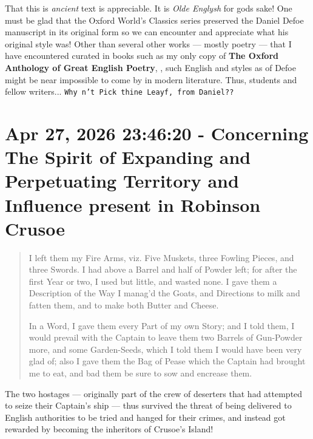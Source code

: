 \documentclass[a4paper]{article}
\begin{document}
That this is \textit{ancient} text is appreciable. It is \textit{Olde Englysh} for gods sake! One must be glad that the Oxford World's Classics series preserved the Daniel Defoe manuscript in its original form so we can encounter and appreciate what his original style was! Other than several other works --- mostly poetry --- that I have encountered curated in books such as my only copy of \textbf{The Oxford Anthology of Great English Poetry}, \cite{wain1996oxford}, such English and styles as of Defoe might be near impossible to come by in modern literature. Thus, students and fellow writers... \texttt{Why n't Pick thine Leayf, from Daniel??}





\section{Apr 27, 2026 23:46:20 - Concerning The Spirit of Expanding and Perpetuating Territory and Influence present in Robinson Crusoe}
\label{SEC68}


\noindent
\begin{minipage}{1\textwidth}
\vspace{1em}
\begin{quotation}
{\ttfamily


I left them my Fire Arms, viz. Five Muskets, three Fowling Pieces, and three Swords. I had above a Barrel and half of Powder left; for after the first Year or two, I used but little, and wasted none. I gave them a Description of the Way I manag’d the Goats, and Directions to milk and fatten them, and to make both Butter and Cheese.

In a Word, I gave them every Part of my own Story; and I told them, I would prevail with the Captain to leave them two Barrels of Gun-Powder more, and some Garden-Seeds, which I told them I would have been very glad of; also I gave them the Bag of Pease which the Captain had brought me to eat, and bad them be sure to sow and encrease them.


}
\end{quotation}
\vspace{1em}
\end{minipage}


The two hostages --- originally part of the crew of deserters that had attempted to seize their Captain's ship --- thus survived the threat of being delivered to English authorities to be tried and hanged for their crimes, and instead got rewarded by becoming the inheritors of Crusoe's Island!
\end{document}
